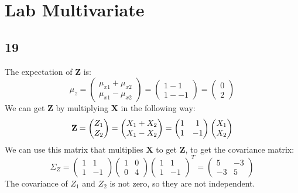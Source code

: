 \documentclass[a4paper,12px]{article}
\begin{document}

\section{Lab Multivariate}
\subsection{19}
The expectation of \textbf{Z} is:
\begin{equation}
    \mu_z=\left( \begin{matrix}\mu_{x1}+\mu_{x2}\\\mu_{x1}-\mu_{x2}\end{matrix} \right)=
    \left(\begin{matrix}1-1\\1--1\end{matrix} \right)=
    \left(\begin{matrix}0\\2\end{matrix} \right)
\end{equation}
We can get \textbf{Z} by multiplying \textbf{X} in the following way:
\begin{equation}
    \label{eq:A_matrix}
    \text{\textbf{Z}}=\left(\begin{matrix}Z_1\\Z_2\end{matrix}\right)=
    \left(\begin{matrix}X_1+X_2\\X_1-X_2\end{matrix}\right)=
    \left(\begin{matrix}1&1\\1&-1\end{matrix}\right)\left(\begin{matrix}X_1\\X_2\end{matrix}\right)
\end{equation}
We can use this matrix that multiplies \textbf{X} to get \textbf{Z}, to get the
 covariance matrix:
\begin{equation}
    \Sigma_Z=\left(\begin{matrix}1&1\\1&-1\end{matrix}\right)
    \left(\begin{matrix}1&0\\0&4\end{matrix}\right)
    \left(\begin{matrix}1&1\\1&-1\end{matrix}\right)^T=
    \left(\begin{matrix}5&-3\\-3&5\end{matrix}\right)
\end{equation}
The covariance of $Z_1$ and $Z_2$ is not zero, so they are not independent.
\end{document}
